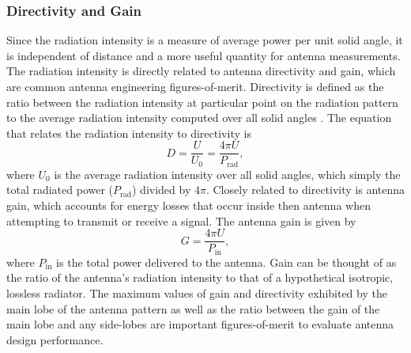 \subsubsection{Directivity and Gain}
Since the radiation intensity is a measure of average power per unit solid angle, it is independent of distance and a more useful quantity for antenna measurements. The radiation intensity is directly related to antenna directivity and gain, which are common antenna engineering figures-of-merit. Directivity is defined as the ratio between the radiation intensity at particular point on the radiation pattern to the average radiation intensity computed over all solid angles \cite{balanis2015antenna}.
The equation that relates the radiation intensity to directivity is
\begin{equation}
    D = \frac{U}{U_0}=\frac{4\pi U}{P_\textrm{rad}},
\end{equation}
where $U_0$ is the average radiation intensity over all solid angles, which simply the total radiated power ($P_\textrm{rad}$) divided by $4\pi$. Closely related to directivity is antenna gain, which accounts for energy losses that occur inside then antenna when attempting to transmit or receive a signal. The antenna gain is given by 
\begin{equation}
    G=\frac{4\pi U}{P_\mathrm{in}},
\end{equation}
where $P_\mathrm{in}$ is the total power delivered to the antenna. Gain can be thought of as the ratio of the antenna's radiation intensity to that of a hypothetical isotropic, lossless radiator. The maximum values of gain and directivity exhibited by the main lobe of the antenna pattern as well as the ratio between the gain of the main lobe and any side-lobes are important figures-of-merit to evaluate antenna design performance. 


